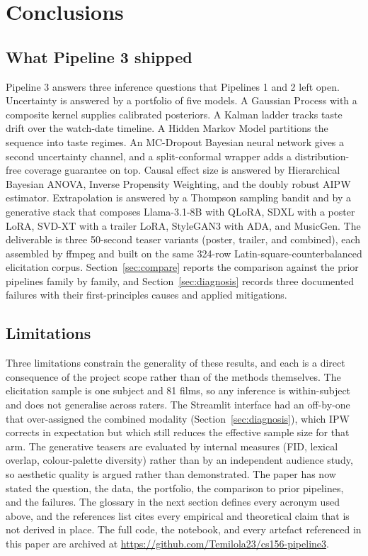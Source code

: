 \documentclass{article}
\begin{document}
\section{Conclusions}
\label{sec:conclusion}

\subsection{What Pipeline 3 shipped}

Pipeline 3 answers three inference questions that Pipelines 1 and 2 left open. Uncertainty is answered by a portfolio of five models. A Gaussian Process with a composite kernel supplies calibrated posteriors. A Kalman ladder tracks taste drift over the watch-date timeline. A Hidden Markov Model partitions the sequence into taste regimes. An MC-Dropout Bayesian neural network gives a second uncertainty channel, and a split-conformal wrapper adds a distribution-free coverage guarantee on top. Causal effect size is answered by Hierarchical Bayesian ANOVA, Inverse Propensity Weighting, and the doubly robust AIPW estimator. Extrapolation is answered by a Thompson sampling bandit and by a generative stack that composes Llama-3.1-8B with QLoRA, SDXL with a poster LoRA, SVD-XT with a trailer LoRA, StyleGAN3 with ADA, and MusicGen. The deliverable is three 50-second teaser variants (poster, trailer, and combined), each assembled by ffmpeg and built on the same 324-row Latin-square-counterbalanced elicitation corpus. Section~\ref{sec:compare} reports the comparison against the prior pipelines family by family, and Section~\ref{sec:diagnosis} records three documented failures with their first-principles causes and applied mitigations.

\subsection{Limitations}

Three limitations constrain the generality of these results, and each is a direct consequence of the project scope rather than of the methods themselves. The elicitation sample is one subject and 81 films, so any inference is within-subject and does not generalise across raters. The Streamlit interface had an off-by-one that over-assigned the combined modality (Section~\ref{sec:diagnosis}), which IPW corrects in expectation but which still reduces the effective sample size for that arm. The generative teasers are evaluated by internal measures (FID, lexical overlap, colour-palette diversity) rather than by an independent audience study, so aesthetic quality is argued rather than demonstrated. The paper has now stated the question, the data, the portfolio, the comparison to prior pipelines, and the failures. The glossary in the next section defines every acronym used above, and the references list cites every empirical and theoretical claim that is not derived in place. The full code, the notebook, and every artefact referenced in this paper are archived at \url{https://github.com/Temilola23/cs156-pipeline3}.
\end{document}
